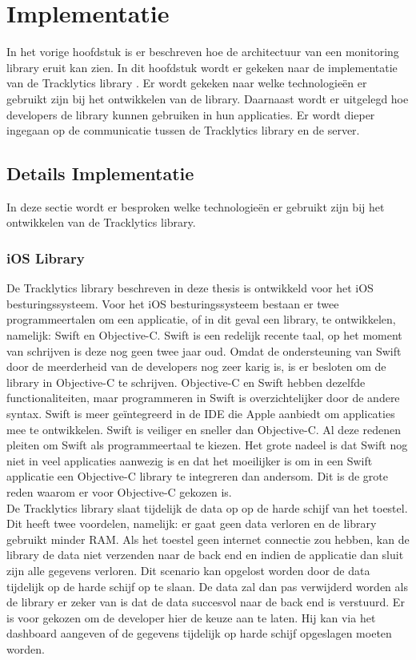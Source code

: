 \chapter{Implementatie}
In het vorige hoofdstuk is er beschreven hoe de architectuur van een monitoring library eruit kan zien. In dit hoofdstuk wordt er gekeken naar de implementatie van de Tracklytics library \cite{Tracklytics}.
Er wordt gekeken naar welke technologie\"en er gebruikt zijn bij het ontwikkelen van de library. Daarnaast wordt er uitgelegd hoe developers de library kunnen gebruiken in hun applicaties. Er wordt dieper ingegaan op de communicatie tussen de Tracklytics library en de server.

\section{Details Implementatie}
In deze sectie wordt er besproken welke technologie\"en er gebruikt zijn bij het ontwikkelen van de Tracklytics library.

\subsection{iOS Library}
De Tracklytics library beschreven in deze thesis is ontwikkeld voor het iOS besturingssysteem. Voor het iOS besturingssysteem bestaan er twee programmeertalen om een applicatie, of in dit geval een library, te ontwikkelen, namelijk: Swift en Objective-C. Swift is een redelijk recente taal, op het moment van schrijven is deze nog geen twee jaar oud. Omdat de ondersteuning van Swift door de meerderheid van de developers nog zeer karig is, is er besloten om de library in Objective-C te schrijven. Objective-C en Swift hebben dezelfde functionaliteiten, maar programmeren in Swift is overzichtelijker door de andere syntax. Swift is meer ge\"integreerd in de IDE die Apple aanbiedt om applicaties mee te ontwikkelen. Swift is veiliger en sneller dan Objective-C. Al deze redenen pleiten om Swift als programmeertaal te kiezen. Het grote nadeel is dat Swift nog niet in veel applicaties aanwezig is en dat het moeilijker is om in een Swift applicatie een Objective-C library te integreren dan andersom. Dit is de grote reden waarom er voor Objective-C gekozen is.\\

De Tracklytics library slaat tijdelijk de data op op de harde schijf van het toestel. Dit heeft twee voordelen, namelijk: er gaat geen data verloren en de library gebruikt minder RAM.
Als het toestel geen internet connectie zou hebben, kan de library de data niet verzenden naar de back end en indien de applicatie dan sluit zijn alle gegevens verloren. Dit scenario kan opgelost worden door de data tijdelijk op de harde schijf op te slaan. De data zal dan pas verwijderd worden als de library er zeker van is dat de data succesvol naar de back end is verstuurd. Er is voor gekozen om de developer hier de keuze aan te laten. Hij kan via het dashboard aangeven of de gegevens tijdelijk op harde schijf opgeslagen moeten worden. \\

